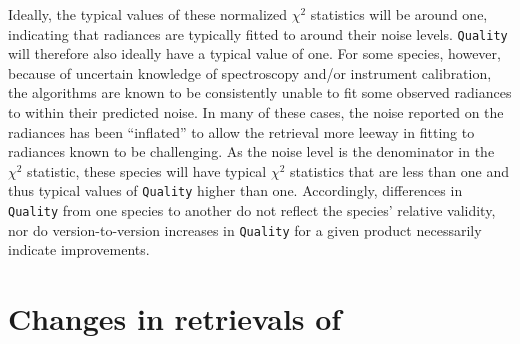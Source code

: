 Ideally, the typical values of these normalized $\chi^2$ statistics will be around one, indicating that radiances are typically fitted to around their noise levels. \texttt{Quality} will therefore also ideally have a typical value of one. For some species, however, because of uncertain knowledge of spectroscopy and/or instrument calibration, the \thisv algorithms are known to be consistently unable to fit some observed radiances to within their predicted noise. In many of these cases, the noise reported on the radiances has been ``inflated'' to allow the retrieval more leeway in fitting to radiances known to be challenging. As the noise level is the denominator in the $\chi^2$ statistic, these species will have typical $\chi^2$ statistics that are less than one and thus typical values of \texttt{Quality} higher than one. Accordingly, differences in \texttt{Quality} from one species to another do not reflect the species' relative validity, nor do version-to-version increases in \texttt{Quality} for a given product necessarily indicate improvements.

\section{Changes in \thisv retrievals of \texorpdfstring{}{N2O}}
\label{sec:V6N2OCorrectionDetails}

